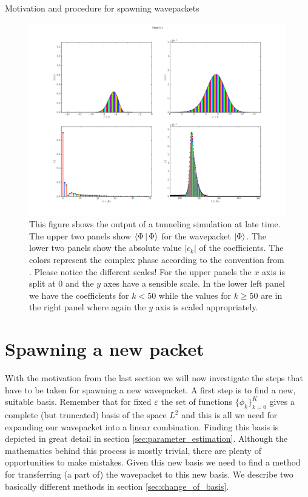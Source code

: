\begin{chapter}{Motivation and procedure for spawning wavepackets}
\begin{figure}
  \centering
  \includegraphics[width=\linewidth]{./figures/spawn_reason.png}
  \caption[Tunneling simulation example motivating the spawning approach]
  {This figure shows the output of a tunneling simulation at late time.
  The upper two panels show $\Braket{\Phi|\Phi}$ for the wavepacket $\Ket{\Phi}$.
  The lower two panels show the absolute value $|c_k|$ of the coefficients. The colors
  represent the complex phase according to the convention from \cite{Thaller_VQM}.
  Please notice the different scales! For the upper panels the $x$ axis is split
  at $0$ and the $y$ axes have a sensible scale. In the lower left panel we have
  the coefficients for $k < 50$ while the values for $k \geq 50$ are in the right
  panel where again the $y$ axis is scaled appropriately.}
  \label{fig:tunneling_highfreq}
\end{figure}


\section{Spawning a new packet}

With the motivation from the last section we will now investigate the steps that
have to be taken for spawning a new wavepacket. A first step is to find a new,
suitable basis. Remember that for fixed $\varepsilon$ the set of functions
$\{\phi_k\}_{k=0}^K$ gives a complete (but truncated) basis of the space $L^2$
and this is all we need for expanding our wavepacket into a linear combination.
Finding this basis is depicted in great detail in section \ref{sec:parameter_estimation}.
Although the mathematics behind this process is mostly trivial, there are plenty
of opportunities to make mistakes. Given this new basis we need to find a method
for transferring (a part of) the wavepacket to this new basis. We describe two
basically different methods in section \ref{sec:change_of_basis}.


\end{chapter}
